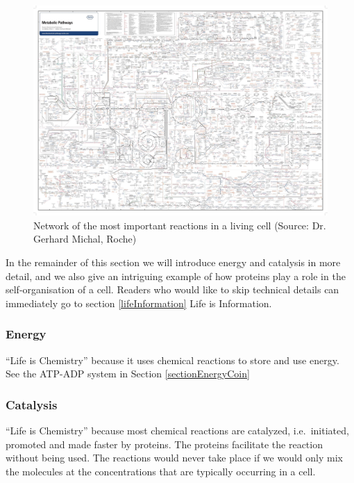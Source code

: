 \documentclass[
  11pt,
]{book}
\begin{document}
\begin{figure}

{\centering \includegraphics[width=1\linewidth]{./figs/roche_pathways} 

}

\caption{Network of the most important reactions in a living cell (Source: Dr. Gerhard Michal, Roche)}\label{fig:chemicalReactionsCell}
\end{figure}

In the remainder of this section we will introduce energy and catalysis in more detail, and we also give an intriguing example of how proteins play a role in the self-organisation of a cell. Readers who would like to skip technical details can immediately go to section \ref{lifeInformation} Life is Information.

\hypertarget{energy}{%
\subsubsection{Energy}\label{energy}}

``Life is Chemistry'' because it uses chemical reactions to store and use energy. See the ATP-ADP system in Section \ref{sectionEnergyCoin}

\hypertarget{catalysis}{%
\subsubsection{Catalysis}\label{catalysis}}

``Life is Chemistry'' because most chemical reactions are catalyzed, i.e.~initiated, promoted and made faster by proteins. The proteins facilitate the reaction without being used. The reactions would never take place if we would only mix the molecules at the concentrations that are typically occurring in a cell.
\end{document}
